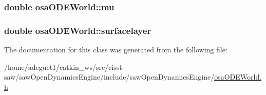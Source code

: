 \hypertarget{classosa_o_d_e_world_ad480cb0282cb22313a485083b24dd242}{
\subsubsection[{mu}]{\setlength{\rightskip}{0pt plus 5cm}double osa\-O\-D\-E\-World\-::mu\hspace{0.3cm}{\ttfamily [protected]}}}\label{classosa_o_d_e_world_ad480cb0282cb22313a485083b24dd242}
\hypertarget{classosa_o_d_e_world_a36fb96aa0db1cb3a9d38f7183be41389}{
\subsubsection[{surfacelayer}]{\setlength{\rightskip}{0pt plus 5cm}double osa\-O\-D\-E\-World\-::surfacelayer\hspace{0.3cm}{\ttfamily [protected]}}}\label{classosa_o_d_e_world_a36fb96aa0db1cb3a9d38f7183be41389}


The documentation for this class was generated from the following file\-:\begin{DoxyCompactItemize}
\item 
/home/adeguet1/catkin\-\_\-ws/src/cisst-\/saw/saw\-Open\-Dynamics\-Engine/include/saw\-Open\-Dynamics\-Engine/\hyperlink{osa_o_d_e_world_8h}{osa\-O\-D\-E\-World.\-h}\end{DoxyCompactItemize}
